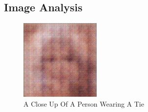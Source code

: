 \documentclass{article}%
\begin{document}
%
\subsection{Image Analysis}%
\label{subsec:ImageAnalysis}%


\begin{figure}[h!]%
\centering%
\includegraphics[width=150px]{500_fake_images/samples_5_169.png}%
\caption{A Close Up Of A Person Wearing A Tie}%
\end{figure}

%
\end{document}
